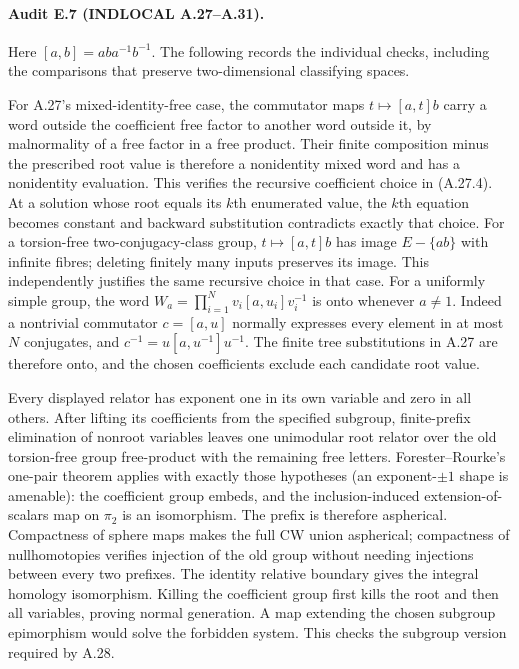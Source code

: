 \paragraph{Audit E.7 (INDLOCAL A.27--A.31).}
Here $[a,b]=aba^{-1}b^{-1}$. The following records the
individual checks, including the comparisons that preserve
two-dimensional classifying spaces.

For A.27's mixed-identity-free case, the commutator maps
$t\mapsto[a,t]b$ carry a word outside the coefficient
free factor to another word outside it, by malnormality
of a free factor in a free product. Their finite
composition minus the prescribed root value is therefore
a nonidentity mixed word and has a nonidentity evaluation.
This verifies the recursive coefficient choice in
(A.27.4). At a solution whose root equals its $k$th
enumerated value, the $k$th equation becomes constant
and backward substitution contradicts exactly that choice.
For a torsion-free two-conjugacy-class group,
$t\mapsto[a,t]b$ has image $E-\{ab\}$ with infinite
fibres; deleting finitely many inputs preserves its
image. This independently justifies the same recursive
choice in that case. For a uniformly simple group,
the word $W_a=\prod_{i=1}^N v_i[a,u_i]v_i^{-1}$ is
onto whenever $a\ne1$. Indeed a nontrivial commutator
$c=[a,u]$ normally expresses every element in at most
$N$ conjugates, and
$c^{-1}=u[a,u^{-1}]u^{-1}$. The finite tree
substitutions in A.27 are therefore onto, and the
chosen coefficients exclude each candidate root value.

Every displayed relator has exponent one in its own
variable and zero in all others. After lifting its
coefficients from the specified subgroup, finite-prefix
elimination of nonroot variables leaves one unimodular
root relator over the old torsion-free group free-product
with the remaining free letters. Forester--Rourke's
one-pair theorem \cite[Main Theorem]{EForesterRourkeDiagrams}
applies with exactly those hypotheses (an exponent-$\pm1$
shape is amenable):
the coefficient group embeds, and the inclusion-induced
extension-of-scalars map on $\pi_2$ is an isomorphism.
The prefix is therefore aspherical. Compactness of sphere
maps makes the full CW union aspherical; compactness
of nullhomotopies verifies injection of the old group
without needing injections between every two prefixes.
The identity relative boundary gives the integral
homology isomorphism. Killing the coefficient group
first kills the root and then all variables, proving
normal generation. A map extending the chosen subgroup
epimorphism would solve the forbidden system. This
checks the subgroup version required by A.28.

